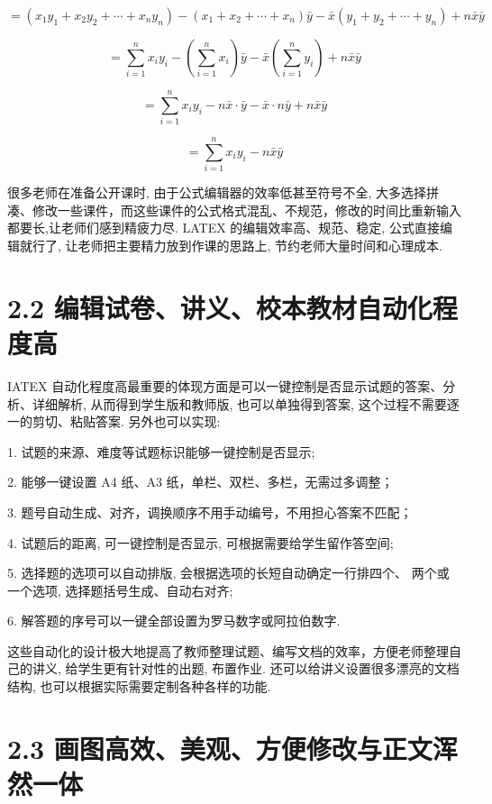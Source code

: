 \documentclass[10pt]{article}
\begin{document}
\[
= \left( {{x}_{1}{y}_{1} + {x}_{2}{y}_{2} + \cdots  + {x}_{n}{y}_{n}}\right)  - \left( {{x}_{1} + {x}_{2} + \cdots  + {x}_{n}}\right) \bar{y} - \bar{x}\left( {{y}_{1} + {y}_{2} + \cdots  + {y}_{n}}\right)  + n\bar{x}\bar{y}
\]

\[
= \mathop{\sum }\limits_{{i = 1}}^{n}{x}_{i}{y}_{i} - \left( {\mathop{\sum }\limits_{{i = 1}}^{n}{x}_{i}}\right) \bar{y} - \bar{x}\left( {\mathop{\sum }\limits_{{i = 1}}^{n}{y}_{i}}\right)  + n\bar{x}\bar{y}
\]

\[
= \mathop{\sum }\limits_{{i = 1}}^{n}{x}_{i}{y}_{i} - n\bar{x} \cdot  \bar{y} - \bar{x} \cdot  n\bar{y} + n\bar{x}\bar{y}
\]

\[
= \mathop{\sum }\limits_{{i = 1}}^{n}{x}_{i}{y}_{i} - n\bar{x}\bar{y}
\]

很多老师在准备公开课时, 由于公式编辑器的效率低甚至符号不全, 大多选择拼凑、修改一些课件，而这些课件的公式格式混乱、不规范，修改的时间比重新输入都要长,让老师们感到精疲力尽. LATEX 的编辑效率高、规范、稳定, 公式直接编辑就行了, 让老师把主要精力放到作课的思路上, 节约老师大量时间和心理成本.

\section*{2.2 编辑试卷、讲义、校本教材自动化程度高}

IATEX 自动化程度高最重要的体现方面是可以一键控制是否显示试题的答案、分析、详细解析, 从而得到学生版和教师版, 也可以单独得到答案, 这个过程不需要逐一的剪切、粘贴答案. 另外也可以实现:

1. 试题的来源、难度等试题标识能够一键控制是否显示;

2. 能够一键设置 A4 纸、A3 纸，单栏、双栏、多栏，无需过多调整；

3. 题号自动生成、对齐，调换顺序不用手动编号，不用担心答案不匹配；

4. 试题后的距离, 可一键控制是否显示, 可根据需要给学生留作答空间;

5. 选择题的选项可以自动排版, 会根据选项的长短自动确定一行排四个、 两个或一个选项, 选择题括号生成、自动右对齐;

6. 解答题的序号可以一键全部设置为罗马数字或阿拉伯数字.

这些自动化的设计极大地提高了教师整理试题、编写文档的效率，方便老师整理自己的讲义, 给学生更有针对性的出题, 布置作业. 还可以给讲义设置很多漂亮的文档结构, 也可以根据实际需要定制各种各样的功能.

\section*{2.3 画图高效、美观、方便修改与正文浑然一体}
\end{document}
